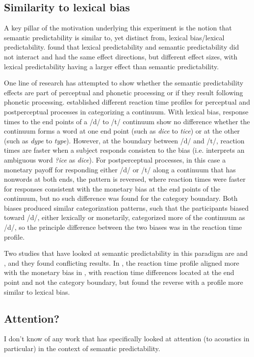 \documentclass[11pt]{article} %
\begin{document}
\subsection{Similarity to lexical bias}

A key pillar of the motivation underlying this experiment is the notion that semantic predictability is similar to, yet distinct from, lexical bias/lexical predictability.  \citet{Scarborough2010} found that lexical predictability and semantic predictability did not interact and had the same effect directions, but different effect sizes, with lexical predictability having a larger effect than semantic predictability.

One line of research has attempted to show whether the semantic predictability effects are part of perceptual and phonetic processing or if they result following phonetic processing.  \citet{Connine1987a} established different reaction time profiles for perceptual and postperceptual processes in categorizing a continuum.  With lexical bias, response times to the end points of a /d/ to /t/ continuum show no difference whether the continuum forms a word at one end point (such as \emph{dice} to \emph{tice}) or at the other (such as \emph{dype} to \emph{type}).  However, at the boundary between /d/ and /t/, reaction times are faster when a subject responds consisten to the bias (i.e. interprets an ambiguous word \emph{?ice} as \emph{dice}).  For postperceptual processes, in this case a monetary payoff for responding either /d/ or /t/ along a continuum that has nonwords at both ends, the pattern is reversed, where reaction times were faster for responses consistent with the monetary bias at the end points of the continuum, but no such difference was found for the category boundary.  Both biases produced similar categorization patterns, such that the participants biased toward /d/, either lexically or monetarily, categorized more of the continuum as /d/, so the principle difference between the two biases was in the reaction time profile.

Two studies that have looked at semantic predictability in this paradigm are \citet{Connine1987} and \citet{Borsky1998}, and they found conflicting results.  In \citet{Connine1987}, the reaction time profile aligned more with the monetary bias in \citet{Connine1987a}, with reaction time differences located at the end point and not the category boundary, but \citet{Borsky1998} found the reverse with a profile more similar to lexical bias.  %

\subsection{Attention?}

I don't know of any work that has specifically looked at attention (to acoustics in particular) in the context of semantic predictability.



\end{document}
